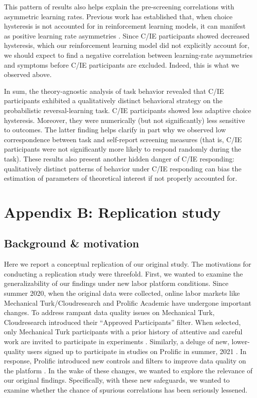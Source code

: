 \documentclass[a4paper,notitlepage,12pt]{article}
\begin{document}
\begin{refsection}[supp]
This pattern of results also helps explain the pre-screening correlations with asymmetric learning rates. Previous work has established that, when choice hysteresis is not accounted for in reinforcement learning models, it can manifest as positive learning rate asymmetries \cite{Katahira2018-ke, sugawara2021dissociation}. Since C/IE participants showed decreased hysteresis, which our reinforcement learning model did not explicitly account for, we should expect to find a negative correlation between learning-rate asymmetries and symptoms before C/IE participants are excluded. Indeed, this is what we observed above. 

In sum, the theory-agnostic analysis of task behavior revealed that C/IE participants exhibited a qualitatively distinct behavioral strategy on the probabilistic reversal-learning task. C/IE participants showed less adaptive choice hysteresis. Moreover, they were numerically (but not significantly) less sensitive to outcomes. The latter finding helps clarify in part why we observed low correspondence between task and self-report screening measures (that is, C/IE participants were not significantly more likely to respond randomly during the task). These results also present another hidden danger of C/IE responding: qualitatively distinct patterns of behavior under C/IE responding can bias the estimation of parameters of theoretical interest if not properly accounted for. 

\break
\section*{Appendix B: Replication study}

\subsection*{Background \& motivation}

Here we report a conceptual replication of our original study. The motivations for conducting a replication study were threefold. First, we wanted to examine the generalizability of our findings under new labor platform conditions. Since summer 2020, when the original data were collected, online labor markets like Mechanical Turk/Cloudresearch and Prolific Academic have undergone important changes. To address rampant data quality issues on Mechanical Turk, Cloudresearch introduced their ``Approved Participants'' filter. When selected, only Mechanical Turk participants with a prior history of attentive and careful work are invited to participate in experiments \cite{cloudresearch_2020-2, hauser2021evaluating}. Similarly, a deluge of new, lower-quality users signed up to participate in studies on Prolific in summer, 2021 \cite{Letzter2021-bw}. In response, Prolific introduced new controls and filters to improve data quality on the platform \cite{prolific_2021}. In the wake of these changes, we wanted to explore the relevance of our original findings. Specifically, with these new safeguards, we wanted to examine whether the chance of spurious correlations has been seriously lessened. 


\end{refsection}
\end{document}
